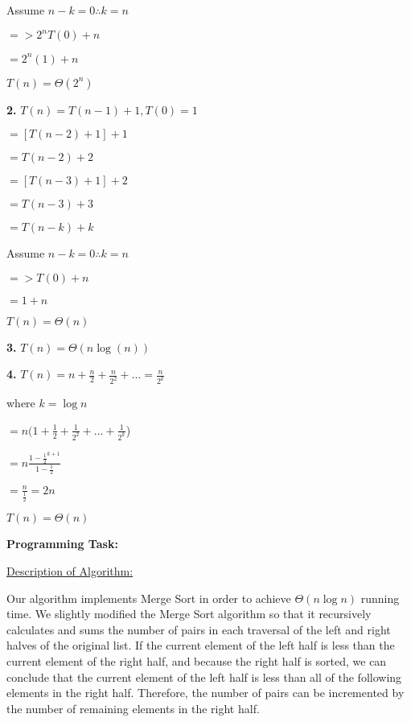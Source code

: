 \documentclass[12pt,letterpaper,final]{report}
\begin{document}
\quad Assume $n - k = 0 \therefore k = n$

\quad $=> 2^nT(0) + n$

\quad $= 2^n(1) + n$

\quad $T(n) = \Theta (2^n)$


\bigskip

\textbf{2.} $T(n) = T(n-1) + 1, T(0) = 1$

\quad $ = [T(n-2) + 1] + 1$

\quad $= T(n-2)+2$

\quad $= [T(n-3) + 1] + 2$

\quad $=T(n-3) + 3$

\quad $=T(n-k) + k$

\quad Assume $n-k = 0 \therefore k = n$

\quad $=> T(0) + n$

\quad $= 1 + n$



\quad $T(n) = \Theta(n)$

\bigskip

\textbf{3.} $T(n) = \Theta(n\log(n))$

\bigskip

\textbf{4.} $T(n) = n + \frac{n}{2} + \frac{n}{2^2} + ... = \frac{n}{2^k}$

\quad where $k = \log{n}$

\quad $=n(1+\frac{1}{2}+\frac{1}{2^2}+...+\frac{1}{2^k}$)

\quad $= n \frac{1-\frac{1}{2}^{k+1}}{1-\frac{1}{2}}$

\quad $=\frac{n}{\frac{1}{2}} = 2n$

\quad $T(n) = \Theta(n)$

\bigskip


\noindent\textbf{Programming Task:} 

\medskip

\underline{Description of Algorithm:}
\medskip

Our algorithm implements Merge Sort in order to achieve $\Theta(n\log n)$ running time. We slightly modified the Merge Sort algorithm so that it recursively calculates and sums the number of pairs in each traversal of the left and right halves of the original list. If the current element of the left half is less than the current element of the right half, and because the right half is sorted, we can conclude that the current element of the left half is less than all of the following elements in the right half. Therefore, the number of pairs can be incremented by the number of remaining elements in the right half.
\end{document}

